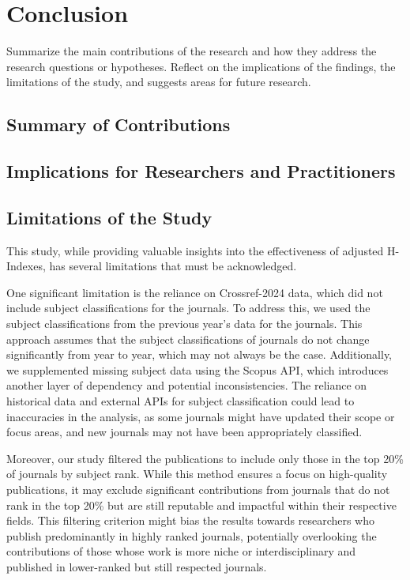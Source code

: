 \chapter{Conclusion}
\label{ch:conclusion}

Summarize the main contributions of the research and how they address the
research questions or hypotheses. Reflect on the implications of the findings,
the limitations of the study, and suggests areas for future research.

\section{Summary of Contributions}

\section{Implications for Researchers and Practitioners}

\section{Limitations of the Study}

This study, while providing valuable insights into the effectiveness of
adjusted H-Indexes, has several limitations that must be acknowledged.

One significant limitation is the reliance on Crossref-2024 data, which did not
include subject classifications for the journals. To address this, we used the
subject classifications from the previous year’s data for the journals. This
approach assumes that the subject classifications of journals do not change
significantly from year to year, which may not always be the case.
Additionally, we supplemented missing subject data using the Scopus API, which
introduces another layer of dependency and potential inconsistencies. The
reliance on historical data and external APIs for subject classification could
lead to inaccuracies in the analysis, as some journals might have updated their
scope or focus areas, and new journals may not have been appropriately
classified.

Moreover, our study filtered the publications to include only those in the top
20\% of journals by subject rank. While this method ensures a focus on
high-quality publications, it may exclude significant contributions from
journals that do not rank in the top 20\% but are still reputable and impactful
within their respective fields. This filtering criterion might bias the results
towards researchers who publish predominantly in highly ranked journals,
potentially overlooking the contributions of those whose work is more niche or
interdisciplinary and published in lower-ranked but still respected journals.

